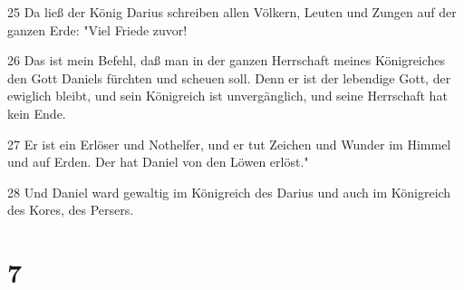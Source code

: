 \par 25 Da ließ der König Darius schreiben allen Völkern, Leuten und Zungen auf der ganzen Erde: "Viel Friede zuvor!
\par 26 Das ist mein Befehl, daß man in der ganzen Herrschaft meines Königreiches den Gott Daniels fürchten und scheuen soll. Denn er ist der lebendige Gott, der ewiglich bleibt, und sein Königreich ist unvergänglich, und seine Herrschaft hat kein Ende.
\par 27 Er ist ein Erlöser und Nothelfer, und er tut Zeichen und Wunder im Himmel und auf Erden. Der hat Daniel von den Löwen erlöst."
\par 28 Und Daniel ward gewaltig im Königreich des Darius und auch im Königreich des Kores, des Persers.

\chapter{7}

